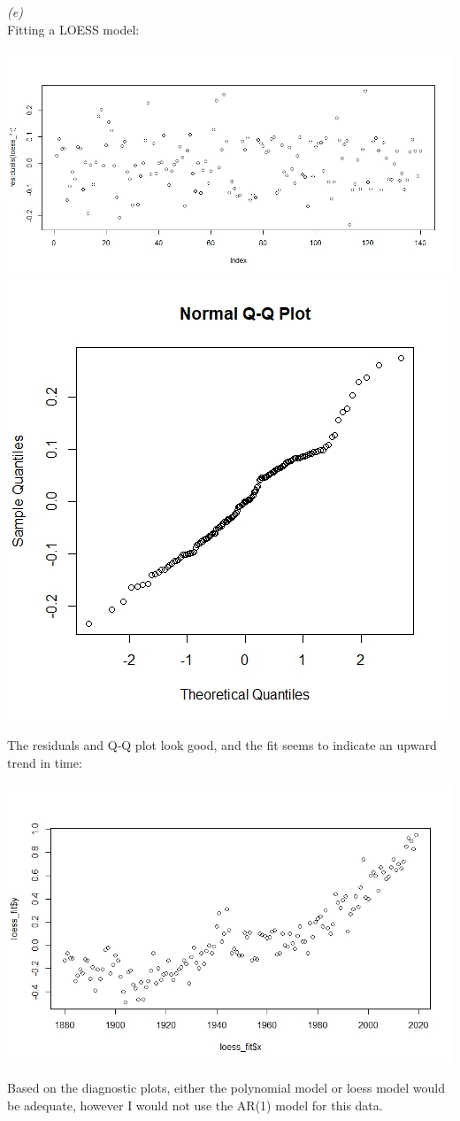 \documentclass[11pt,a4paper]{article}
\begin{document}
\textit{(e)}\\

Fitting a LOESS model:\\

\begin{center}
\includegraphics[scale = 0.4]{resid_loess.jpeg}
\includegraphics[scale = 0.4]{qq_loess.jpeg}
\end{center}

The residuals and Q-Q plot look good, and the fit seems to indicate an upward trend in time:

\begin{center}
\includegraphics[scale = 0.8]{loess_fit.jpeg}
\end{center}

Based on the diagnostic plots, either the polynomial model or loess model would be adequate, however I would not use the AR(1) model for this data.
\end{document}
